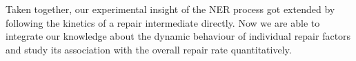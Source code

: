 \begin{figure}[b!]
\begin{center}
\label{fig:DNArepairKinetic}
%
%
\end{center}
\end{figure}
Taken together, our experimental insight of the NER process got extended by following the kinetics of a repair intermediate directly. Now we are able to integrate our knowledge about the dynamic behaviour of individual repair factors and study its association with the overall repair rate quantitatively.    
